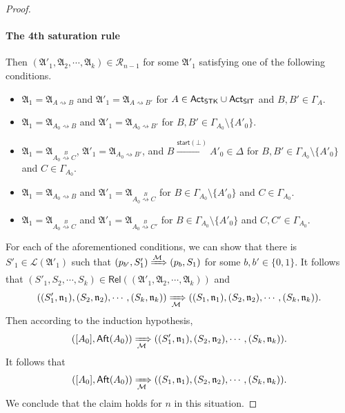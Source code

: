 \documentclass[preprint,12pt]{elsarticle}
\newcommand\Mm{{\mathcal{M} }}
\newcommand\act{{\sf Act}}
\newcommand\aft{{\sf Aft}}
\newcommand\singletask{{\sf STK}}
\newcommand\singleinstance{{\sf SIT}}
\newcommand\startactivity{{\mathsf{start} }}
\newcommand\aname{\mathfrak{n}}
\newcommand\AutReach{\mathscr{R}}
\newcommand\Rel{\mathsf{Rel}}
\newcommand\Aut{{\mathfrak{A} }}
\newcommand\Lang{{\mathscr{L} }}
\begin{document}
\begin{proof}
\paragraph*{The 4th saturation rule} Then $(\Aut'_1, \Aut_2, \cdots, \Aut_k) \in \AutReach_{n-1}$ for some $\Aut'_1$ satisfying one of the following conditions. 
\begin{itemize}
\item $\Aut_1 = \Aut_{A \rightsquigarrow B}$ and $\Aut'_1 = \Aut_{A \rightsquigarrow B'}$ for $A \in \act_\singletask \cup \act_\singleinstance$ and $B, B' \in \Gamma_A$. 
%
\item $\Aut_1 = \Aut_{A_0 \rightsquigarrow B}$ and $\Aut'_1 = \Aut_{A_0 \rightsquigarrow B'}$ for $B, B' \in \Gamma_{A_0} \setminus \{A'_0\}$.  
%
\item $\Aut_1 = \Aut_{A_0 \stackrel{B}{\rightsquigarrow} C}$, $\Aut'_1 = \Aut_{A_0 \rightsquigarrow B'}$, and $B \xrightarrow{\startactivity(\bot)} A'_0 \in \Delta$ for $B, B' \in \Gamma_{A_0} \setminus \{A'_0\}$ and $C \in \Gamma_{A_0}$. 
%
\item $\Aut_1 = \Aut_{A_0 \rightsquigarrow B}$ and $\Aut'_1 = \Aut_{A_0 \stackrel{B}{\rightsquigarrow} C}$ for $B \in \Gamma_{A_0} \setminus \{A'_0\}$ and $C \in \Gamma_{A_0}$. 
%
\item $\Aut_1 = \Aut_{A_0 \stackrel{B}{\rightsquigarrow} C}$ and $\Aut'_1 = \Aut_{A_0 \stackrel{B}{\rightsquigarrow} C'}$ for $B \in \Gamma_{A_0} \setminus \{A'_0\}$ and $C, C' \in \Gamma_{A_0}$.
\end{itemize}

For each of the aforementioned conditions, 
we can show that there is $S'_1 \in \Lang(\Aut'_1)$ such that $(p_{b'}, S'_1) \xRightarrow{\Mm} (p_b, S_1)$ for some $b, b' \in \{0, 1\}$.  
It follows that $(S'_1, S_2, \cdots, S_k) \in \Rel((\Aut'_1, \Aut_2, \cdots, \Aut_k))$ and
 \[((S'_1, \aname_1), (S_2, \aname_2), \cdots, (S_k, \aname_k)) \xRightarrow[\Mm]{} ((S_1, \aname_1), (S_2, \aname_2), \cdots, (S_k, \aname_k)). \]
Then according to the induction hypothesis, 
 \[([A_0], \aft(A_0)) \xRightarrow[\Mm]{} ((S'_1, \aname_1), (S_2, \aname_2), \cdots, (S_k, \aname_k)). \]
It follows that  
 \[([A_0], \aft(A_0)) \xRightarrow[\Mm]{} ((S_1, \aname_1), (S_2, \aname_2), \cdots, (S_k, \aname_k)). \]
We conclude that the claim holds for $n$ in this situation.  


\end{proof}
\end{document}
